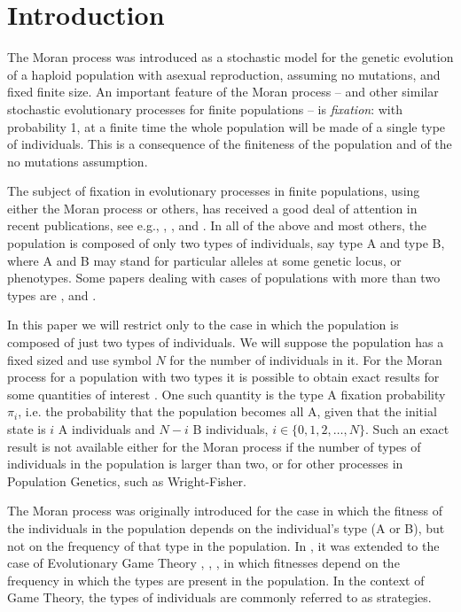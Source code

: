 \documentclass[12pt]{article}
\begin{document}
\section{Introduction}
\label{secintro}
The Moran process \cite{moran} was introduced as a stochastic model for the genetic evolution of a haploid population with asexual reproduction, assuming no mutations, and fixed finite size. An important feature of the Moran process -- and other similar stochastic evolutionary processes for finite populations -- is \textit{fixation}: with probability 1, at a finite time the whole population will be made of a single type of individuals. This is a consequence of the finiteness of the population and of the no mutations assumption.

The subject of fixation in evolutionary processes in finite populations, using either the Moran process or others, has received a good deal of attention in recent publications, see e.g.\cite{ChalubSouza2009}, \cite{ChalubSouza2016}, \cite{XuZhangetal}, \cite{AshcroftAltrockGalla} and \cite{DurandLessard}. In all of the above and most others, the population is composed of only two types of individuals, say type A and type B, where A and B may stand for particular alleles at some genetic locus, or phenotypes. Some papers dealing with cases of populations with more than two types are \cite{Mobilia},\cite{Durneyetal} and \cite{TraulsenClaussenHauert}.

In this paper we will restrict only to the case in which the population is composed of just two types of individuals. We will suppose the population has a fixed sized and use symbol $N$ for the number of individuals in it. For the Moran process for a population with two types it is possible to obtain exact results for some quantities of interest \cite{ewens}. One such quantity is the type A fixation probability $\pi_i$, i.e. the probability that the population becomes all A, given that the initial state is $i$ A individuals and $N-i$ B individuals, $i\in \{0, 1, 2, \dots, N\}$. Such an exact result is not available either for the Moran process if the number of types of individuals in the population is larger than two, or for other processes in Population Genetics, such as Wright-Fisher.

The Moran process was originally introduced for the case in which the fitness of the individuals in the population depends on the individual's type (A or B), but not on the frequency of that type in the population. In \cite{nowaknature}, \cite{taylor} it was extended to the case of Evolutionary Game Theory \cite{MaynardSmithPrice}, \cite{hofbauersigmund}, \cite{nowakbook}, in which  fitnesses depend on the frequency in which the types are present in the population. In the context of Game Theory, the types of individuals are commonly referred to as strategies.
\end{document}
